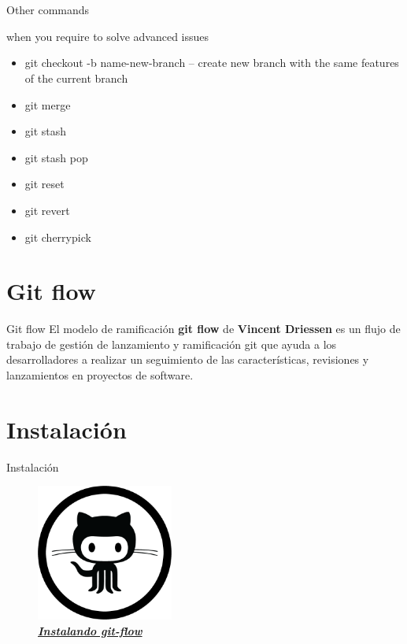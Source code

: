 \documentclass{beamer}
\begin{document}
\section{}
\begin{frame}{Other commands}

\begin{block}{when you require to solve advanced issues}
\begin{itemize}

\item git checkout -b name-new-branch -- create new branch with the same features of the current branch
\item git merge
\item git stash
\item git stash pop
\item git reset
\item git revert
\item git cherrypick
\end{itemize}

\end{block}

\end{frame}

\section{Git flow}
\begin{frame}{Git flow}
El modelo de ramificación \textbf{git flow} de \textbf{Vincent Driessen} es un flujo de trabajo de gestión de lanzamiento y ramificación git que ayuda a los desarrolladores a realizar un seguimiento de las características, revisiones y lanzamientos en proyectos de software.

\end{frame}

\section{Instalación}
\begin{frame}{Instalación}

\begin{figure}[H]
\centering
\includegraphics[width=0.4\textwidth]{github}
\caption{\href{https://github.com/nvie/gitflow/wiki/Installation}{\textbf{\textit{Instalando git-flow}}}}
\end{figure}
\end{frame}
\end{document}

